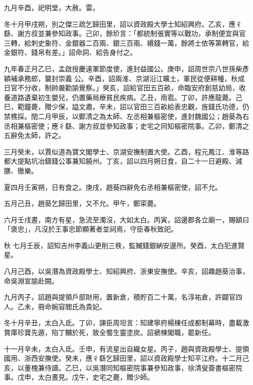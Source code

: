\begin{pinyinscope}
 九月辛酉，祀明堂，大赦。雷。



 冬十月甲戌朔，別之傑三疏乞歸田里，詔以資政殿大學士知紹興府。乙亥，應彳繇、謝方叔並兼參知政事。己卯，餘玠言：「都統制張實等以戰功，承制便宜與官三轉，給刺史象符、金銀器二百兩、銀三百兩、緡錢一萬，餘將士依等第轉官，給金銀符、錢帛有差。」詔命詞、給告身付之。



 九年春正月乙巳，孟啟授慶遠軍節度使，進封益國公。庚申，詔周世宗八世孫柴彥穎補承務郎，襲封崇義
 公。辛酉，詔兩淮、京湖沿江曠土，軍民從便耕種，秋成日官不分收，制帥嚴勸諭覺察。」癸亥，詔給官田五百畝，命臨安府創慈幼局，收養道路遺棄初生嬰兒，仍置藥局療貧民疾病。乙丑，雨雹。丁卯，許應龍薨。己巳，範鐘薨，贈少保，謚文肅。辛未，詔以官田三百畝給表忠觀，旌錢氏功德，仍禁樵採。閏二月甲辰，以鄭清之為太師、左丞相兼樞密使，進封魏國公；趙葵為右丞相兼樞密使；應彳繇、謝方叔並參知政事；史宅之同知樞密院事。乙卯，鄭清之
 五辭免太師，許之。



 三月癸未，以賈似道為寶文閣學士、京湖安撫制置大使。乙酉，程元鳳江、淮等路都大提點坑冶鑄錢公事兼知饒州。丁亥，詔以四月朔日食，自二十一日避殿、減膳、徹樂。



 夏四月壬寅朔，日有食之。庚戌，趙葵四辭免右丞相兼樞密使，詔不允。



 五月己丑，趙葵乞歸田里，又不允。甲午，鄭寀薨。



 六月壬戌晝，南方有星，急流至濁沒，大如太白。丙寅，詔邊郡各立廟一，賜額曰「褒忠」，凡沒於王事忠節顯著者並祠焉，守臣春秋致祀。



 秋
 七月壬辰，詔知吉州李義山更削三秩，監贓錢銀納安邊所。癸酉，太白犯進賢星。



 八月己酉，以吳潛為資政殿學士、知紹興府、浙東安撫使。辛亥，詔趣趙葵治事，命吳淵宣諭赴闕。



 九月丙子，詔趙與提領戶部財用，置新倉，積貯百二十萬，名淳祐倉，許闢官四人。乙未，冊命婉容閻氏為貴妃。



 冬十月辛丑，太白入氐。丁卯，諫臣周坦言：知建寧府楊棟任成都制幕時，盡載激賞庫珍寶先遁，陷丁黼於死，致全蜀生靈塗炭。詔褫棟閣職，罷新任。



 十一月辛未，太白入氐。壬申，有流星出自織女星。丙子，趙與資政殿學士、提領國用、浙西安撫使。癸未，應彳繇乞歸田里，詔以資政殿學士知平江府。十二月己亥，以董槐兼侍讀。乙巳，以吳潛同知樞密院事兼參知政事，徐清叟簽書樞密院事。戊申，太白晝見。戊午，史宅之薨，贈少師。




\end{pinyinscope}
